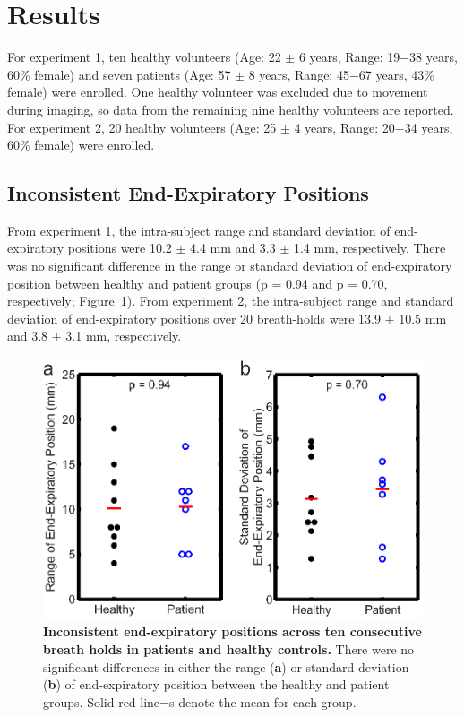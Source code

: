 \section{Results}
	For experiment 1, ten healthy volunteers (Age: 22 $\pm$ 6 years, Range: 19$-$38 years, 60\% female) and seven patients (Age: 57 $\pm$ 8 years, Range: 45$-$67 years, 43\% female) were enrolled. One healthy volunteer was excluded due to movement during imaging, so data from the remaining nine healthy volunteers are reported. For experiment 2, 20 healthy volunteers (Age: 25 $\pm$ 4 years, Range: 20$-$34 years, 60\% female) were enrolled.

\subsection{Inconsistent End-Expiratory Positions}
	From experiment 1, the intra-subject range and standard deviation of end-expiratory positions were 10.2 $\pm$ 4.4 mm and 3.3 $\pm$ 1.4 mm, respectively. There was no significant difference in the range or standard deviation of end-expiratory position between healthy and patient groups (p = 0.94 and p = 0.70, respectively; Figure~\ref{fig:diaphragmpositions}). From experiment 2, the intra-subject range and standard deviation of end-expiratory positions over 20 breath-holds were 13.9 $\pm$ 10.5 mm and 3.8 $\pm$ 3.1 mm, respectively.

	\begin{figure}
		\centering %
		\includegraphics{figures/torsionpaper/Fig6-diaphragmPositiondata}
		\caption[Inconsistent end expiratory positions across ten consecutive breath holds in patients and healthy controls]{\textbf{Inconsistent end-expiratory positions across ten consecutive breath holds in patients and healthy controls.} There were no significant differences in either the range (\textbf{a}) or standard deviation (\textbf{b}) of end-expiratory position between the healthy and patient groups. Solid red line¬s denote the mean for each group.}
		\label{fig:diaphragmpositions}
	\end{figure}

